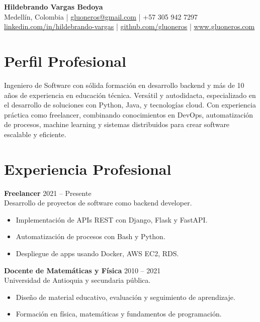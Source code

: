 \documentclass[a4paper,10pt]{article}
\begin{document}
	
	\begin{center}
		{\Huge \textbf{Hildebrando Vargas Bedoya}} \\
		\vspace{4pt}
		Medellín, Colombia \quad | \quad
		\href{mailto:gluoneros@gmail.com}{gluoneros@gmail.com} \quad | \quad
		+57 305 942 7297 \\
		\href{https://linkedin.com/in/hildebrando-vargas}{linkedin.com/in/hildebrando-vargas} \quad | \quad
		\href{https://github.com/gluoneros}{github.com/gluoneros} \quad | \quad
		\href{http://www.gluoneros.com}{www.gluoneros.com}
	\end{center}
	
	\vspace{0.5em}
	
	\section*{Perfil Profesional}
	Ingeniero de Software con sólida formación en desarrollo backend y más de 10 años de experiencia en educación técnica. Versátil y autodidacta, especializado en el desarrollo de soluciones con Python, Java, y tecnologías cloud. Con experiencia práctica como freelancer, combinando conocimientos en DevOps, automatización de procesos, machine learning y sistemas distribuidos para crear software escalable y eficiente.
	
	\section*{Experiencia Profesional}
	\textbf{Freelancer} \hfill 2021 -- Presente \\
	Desarrollo de proyectos de software como backend developer. 
	\begin{itemize}
		\item Implementación de APIs REST con Django, Flask y FastAPI.
		\item Automatización de procesos con Bash y Python.
		\item Despliegue de apps usando Docker, AWS EC2, RDS.
	\end{itemize}
	
	\textbf{Docente de Matemáticas y Física} \hfill 2010 -- 2021 \\
	Universidad de Antioquia y secundaria pública. 
	\begin{itemize}
		\item Diseño de material educativo, evaluación y seguimiento de aprendizaje.
		\item Formación en física, matemáticas y fundamentos de programación.
	\end{itemize}
	
\end{document}
